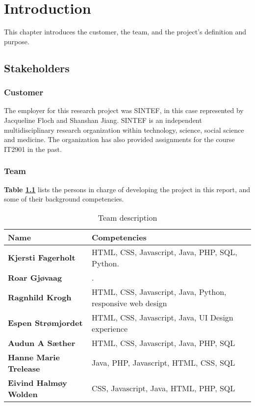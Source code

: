
\chapter{Introduction}

This chapter introduces the customer, the team, and the project's definition and purpose.

\section{Stakeholders}

\subsection{Customer}

The employer for this research project was SINTEF, in this case represented by Jacqueline Floch and Shanshan Jiang. SINTEF is an independent multidisciplinary research organization within technology, science, social science and medicine. The organization has also provided assignments for the course IT2901 in the past.

\subsection{Team}

\textbf{Table \ref{Tab:team}} lists the persons in charge of developing the project in this report, and some of their background competencies.

\begin{table}[!h]
	\begin{center}
		\begin{tabular}{  l  l }
			\textbf{Name} & \textbf{Competencies} \\ \hline
			\textbf{Kjersti Fagerholt} & HTML, CSS, Javascript, Java, PHP, SQL, Python. \\ 
			\textbf{Roar Gjøvaag} & . \\ 
			\textbf{Ragnhild Krogh} & HTML, CSS, Javascript, Java, Python, responsive web design \\ 
			\textbf{Espen Strømjordet} & HTML, CSS, Javascript, Java,
			UI Design experience \\ 
			\textbf{Audun A Sæther} & HTML, CSS, Javascript, Java, PHP, SQL \\ 
			\textbf{Hanne Marie Trelease} & Java, PHP, Javascript, HTML, CSS, SQL \\ 
			\textbf{Eivind Halmøy Wolden} & CSS, Javascript, Java, HTML, PHP, SQL \\ 
		\end{tabular}
	\end{center}
	\caption{Team description}
	\label{Tab:team}
\end{table}

